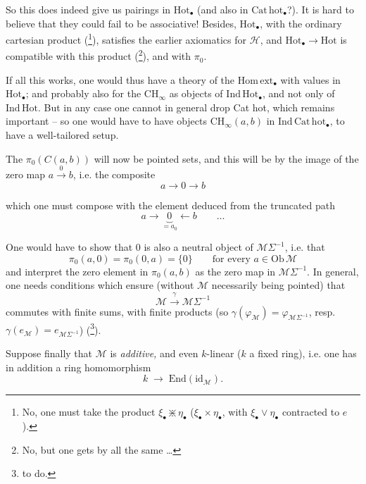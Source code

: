 \documentclass[11pt]{article}
\newcommand{\printedpage}[1]{\marginpar{\footnotesize p.~#1}}
\newcommand{\msp}[1]{\marginpar{\footnotesize [#1]}}
\newcommand{\M}{\mathcal{M}}
\newcommand{\Hot}{\mathrm{Hot}}
\newcommand{\Homext}{\mathrm{Hom\,ext}}
\begin{document}
\noindent{}So this does indeed give us pairings in $\Hot_{\bullet}$ (and also in $\mathrm{Cat\,hot}_{\bullet}$?). It is hard to believe that they could fail to be associative! Besides, $\Hot_{\bullet}$, with the ordinary cartesian product (\footnote[4]{No, one must take the product $\xi_{\bullet} \divideontimes \eta_{\bullet}$ ($\xi_{\bullet}\times\eta_{\bullet}$, with $\xi_{\bullet}\vee\eta_{\bullet}$ contracted to $e$).}), satisfies the earlier axiomatics for $\mathcal{H}$, and $\Hot_{\bullet} \longrightarrow \Hot$ is compatible with this product (\footnote[5]{No, but one gets by all the same \ldots}), and with $\pi_0$. %

If all this works, one would thus have a theory of the $\Homext_{\bullet}$ with values in $\Hot_{\bullet}$; and probably also for the $\mathrm{CH}_{\infty}$ as objects of $\mathrm{Ind\,Hot}_{\bullet}$, and not only of $\mathrm{Ind\,Hot}$. But
\printedpage{11}
in any case one cannot in general drop Cat hot, which remains important -- so one would have to have objects $\mathrm{CH}_{\infty}(a,b)$ in $\mathrm{Ind\,Cat\,hot}_{\bullet}$, to have a well-tailored setup.

The $\pi_0(C(a,b))$ will now be pointed sets, and this will be by the image of the zero map $a \xrightarrow{\ 0\ } b$, i.e. the composite
\[
a \longrightarrow 0 \longrightarrow b
\]

\msp{page 18}

which one must compose with the element deduced from the truncated path %
\[
a \longrightarrow \underbrace{0}_{=a_0} \longleftarrow b \qquad \ldots
\]

One would have to show that 0 is also a neutral object of $\M\Sigma^{-1}$, i.e. that
\[
\pi_0(a,0) = \pi_0(0,a) = \{0\} \qquad \text{for every } a \in \mathrm{Ob}\,\M
\]
and interpret the zero element in $\pi_0(a,b)$ as the zero map in $\M\Sigma^{-1}$. In general, one needs conditions which ensure (without $\M$ necessarily being pointed) that
\[
\M \xrightarrow{\ \gamma\ } \M\Sigma^{-1}
\]
commutes with finite sums, with finite products (so $\gamma(\varphi_{\M}) = \varphi_{\M\Sigma^{-1}}$, resp. $\gamma(e_{\M}) = e_{\M\Sigma^{-1}}$) (\footnote[6]{to do.}).

Suppose finally that $\M$ is \textit{additive,} and even $k$-linear ($k$ a fixed ring), i.e. one has in addition a ring homomorphism
\[
k \;\longrightarrow\; \mathrm{End}(\mathrm{id}_{\M}).
\]
\end{document}
